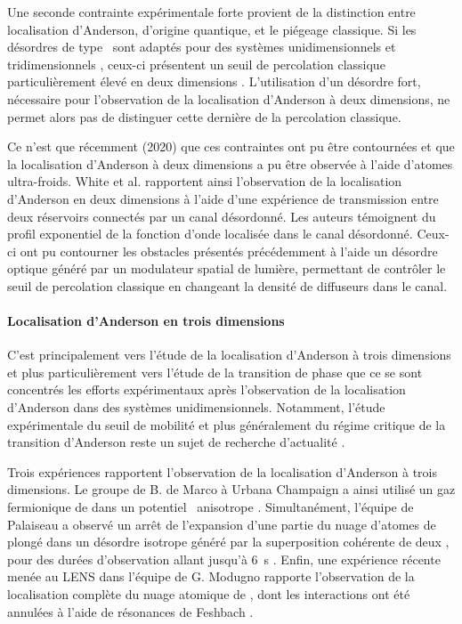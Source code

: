 Une seconde contrainte expérimentale forte provient de la distinction entre localisation d'Anderson, d'origine quantique, et le piégeage classique. Si les désordres de type \speckle\ sont adaptés pour des systèmes unidimensionnels et tridimensionnels \citep{pilati2010dilute}, ceux-ci présentent un seuil de percolation classique particulièrement élevé en deux dimensions \citep{morong2015simulation}. L'utilisation d'un désordre fort, nécessaire pour l'observation de la localisation d'Anderson à deux dimensions, ne permet alors pas de distinguer cette dernière de la percolation classique.

Ce n'est que récemment (2020) que ces contraintes ont pu être contournées et que la localisation d'Anderson à deux dimensions a pu être observée à l'aide d'atomes ultra-froids. White et al. \citep{white2020observation} rapportent ainsi l'observation de la localisation d'Anderson en deux dimensions à l'aide d'une expérience de transmission entre deux réservoirs connectés par un canal désordonné. Les auteurs témoignent du profil exponentiel de la fonction d'onde localisée dans le canal désordonné. Ceux-ci ont pu contourner les obstacles présentés précédemment à l'aide un désordre optique généré par un modulateur spatial de lumière, permettant de contrôler le seuil de percolation classique en changeant la densité de diffuseurs dans le canal. 



\paragraph*{Localisation d'Anderson en trois dimensions}
C'est principalement vers l'étude de la localisation d'Anderson à trois dimensions et plus particulièrement vers l'étude de la transition de phase que ce se sont concentrés les efforts expérimentaux après l'observation de la localisation d'Anderson dans des systèmes unidimensionnels. Notamment, l'étude expérimentale du seuil de mobilité et plus généralement du régime critique de la transition d'Anderson reste un sujet de recherche d'actualité \citep{pasek2017anderson}.

Trois expériences rapportent l'observation de la localisation d'Anderson à trois dimensions. Le groupe de B. de Marco à Urbana Champaign a ainsi utilisé un gaz fermionique de  dans un potentiel \speckle\ anisotrope \citep{kondov2011three}. Simultanément, l'équipe de Palaiseau a observé un arrêt de l'expansion d'une partie du nuage d'atomes de  plongé dans un désordre isotrope généré par la superposition cohérente de deux \speckles , pour des durées d'observation allant jusqu'à \SI{6}{\second} \citep{jendrzejewski2012three}. Enfin, une expérience récente menée au LENS dans l'équipe de G. Modugno rapporte l'observation de la localisation complète du nuage atomique de , dont les interactions ont été annulées à l'aide de résonances de Feshbach \citep{semeghini2015measurement}.

